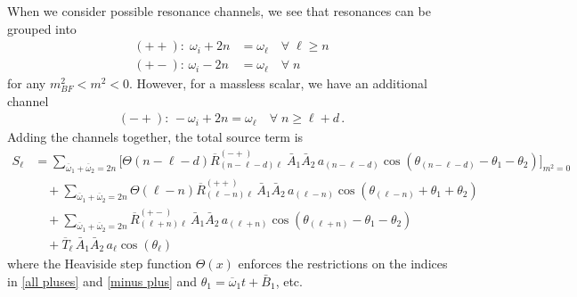 \documentclass[../PhD.tex]{subfiles}
\newcommand{\oone}{\overline{\omega}_1}
\newcommand{\otwo}{\overline{\omega}_2}
\begin{document}
When we consider possible resonance channels, we see that resonances can be grouped into
\begin{align}
\label{all pluses}
(++): \; \omega_i + 2n &= \omega_\ell \quad \forall \; \ell \geq n \\
(+-): \, \omega_i - 2n &=\omega_\ell \quad \forall \; n
\end{align}
for any $m^2_{BF} < m^2 < 0$. However, for a massless scalar, we have an additional channel
\begin{align}
\label{minus plus}
(-+): \, -\omega_i + 2n = \omega_\ell \quad \forall \; n \geq \ell + d \, .
\end{align}
Adding the channels together, the total source term is
\begin{align}
\label{add to integer}
S_\ell &=  \!\!\!\! \sum_{\oone + \otwo = 2n}\bigg[ \Theta\left( n - \ell - d \right) \overline{R}^{(-+)}_{(n - \ell - d) \ell} \ \bar A_1 \bar A_2 \, a_{(n - \ell - d)} \cos \left( \theta_{(n - \ell - d)} - \theta_1 - \theta_2 \right) \bigg]_{m^2 = 0}  \nonumber \\ 
%
&  \quad + \!\!\!\! \sum_{\oone + \otwo = 2n} \!\!\!\! \Theta \left( \ell - n \right)  \overline{R}^{(++)}_{(\ell - n)\ell} \, \bar A_1 \bar A_2 \, a_{(\ell - n)} \cos \left( \theta_{(\ell - n)} + \theta_1 + \theta_2 \right) \nonumber \\
%
& \quad  + \!\!\!\! \sum_{\oone + \otwo = 2n} \!\!\!\! \overline{R}^{(+-)}_{(\ell + n) \ell} \, \bar A_1 \bar A_2 \, a_{(\ell + n)} \cos\left( \theta_{(\ell + n)} - \theta_1 - \theta_2 \right) \nonumber \\
%
& \quad + \overline{T}_{\ell} \, \bar A_1 \bar A_2 \, a_\ell \cos \left( \theta_\ell \right)
\end{align}
where the Heaviside step function $\Theta(x)$ enforces the restrictions on the indices in \eqref{all pluses} and \eqref{minus plus} and $\theta_1 = \oone t + \bar B_1$, etc. 
\end{document}
